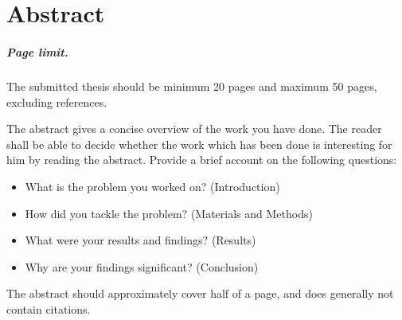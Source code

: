 %

\newpage
\vspace{3cm}

\chapter*{Abstract}

\paragraph{Page limit.} The submitted thesis should be minimum 20 pages and maximum 50 pages, excluding references.

\noindent The abstract gives a concise overview of the work you have done. The reader shall be able to decide whether the work which has been done is interesting for him by reading the abstract. Provide a brief account on the following questions:

\begin{itemize}
 \item What is the problem you worked on? (Introduction)
 \item How did you tackle the problem? (Materials and Methods)
 \item What were your results and findings? (Results)
 \item Why are your findings significant? (Conclusion)
\end{itemize}

\noindent The abstract should approximately cover half of a page, and does generally not contain citations.


